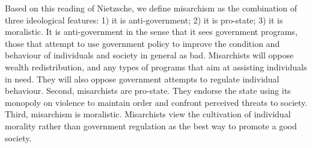 \documentclass[12pt,]{article}
\begin{document}
Based on this reading of Nietzsche, we define misarchism as the
combination of three ideological features: 1) it is anti-government; 2)
it is pro-state; 3) it is moralistic. It is anti-government in the sense
that it sees government programs, those that attempt to use government
policy to improve the condition and behaviour of individuals and society
in general as bad. Misarchists will oppose wealth redistribution, and
any types of programs that aim at assisting individuals in need. They
will also oppose government attempts to regulate individual behaviour.
Second, misarchists are pro-state. They endorse the state using its
monopoly on violence to maintain order and confront perceived threats to
society. Third, misarchism is moralistic. Misarchists view the
cultivation of individual morality rather than government regulation as
the best way to promote a good society.
\end{document}
